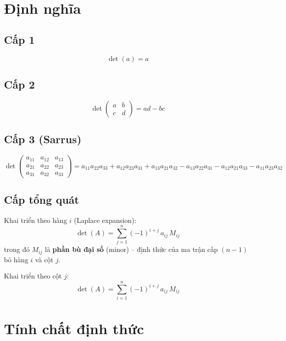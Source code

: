 
\section{Định nghĩa}

\subsection{Cấp 1}
\[
\det(a) = a
\]

\subsection{Cấp 2}
\[
\det\begin{pmatrix} a & b \\ c & d \end{pmatrix} = ad - bc
\]

\subsection{Cấp 3 (Sarrus)}
\[
\det\begin{pmatrix}
a_{11} & a_{12} & a_{13} \\
a_{21} & a_{22} & a_{23} \\
a_{31} & a_{32} & a_{33}
\end{pmatrix}
= a_{11}a_{22}a_{33} + a_{12}a_{23}a_{31} + a_{13}a_{21}a_{32}
- a_{13}a_{22}a_{31} - a_{12}a_{21}a_{33} - a_{11}a_{23}a_{32}
\]

\subsection{Cấp tổng quát}
Khai triển theo hàng $i$ (Laplace expansion):
\[
\det(A) = \sum_{j=1}^{n} (-1)^{i+j} \, a_{ij} \, M_{ij}
\]
trong đó $M_{ij}$ là \textbf{phần bù đại số} (minor) -- định thức của ma trận cấp $(n-1)$ bỏ hàng $i$ và cột $j$.

Khai triển theo cột $j$:
\[
\det(A) = \sum_{i=1}^{n} (-1)^{i+j} \, a_{ij} \, M_{ij}
\]

\section{Tính chất định thức}

